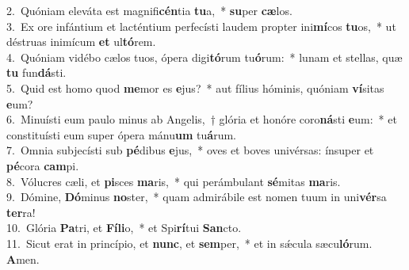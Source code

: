 {2.~}Quóniam eleváta est magnifi\textbf{cén}tia \textbf{tu}a,~* \textbf{su}per \textbf{cæ}los.\\
{3.~}Ex ore infántium et lacténtium perfecísti laudem propter ini\textbf{mí}cos \textbf{tu}os,~* ut déstruas inimícum \textbf{et} ul\textbf{tó}rem.\\
{4.~}Quóniam vidébo cælos tuos, ópera digi\textbf{tó}rum tu\textbf{ó}rum:~* lunam et stellas, quæ \textbf{tu} fun\textbf{dá}sti.\\
{5.~}Quid est homo quod \textbf{me}mor es \textbf{e}jus?~* aut fílius hóminis, quóniam \textbf{ví}sitas \textbf{e}um?\\
{6.~}Minuísti eum paulo minus ab Angelis,~† glória et honóre coro\textbf{ná}sti \textbf{e}um:~* et constituísti eum super ópera mánu\textbf{um} tu\textbf{á}rum.\\
{7.~}Omnia subjecísti sub \textbf{pé}dibus \textbf{e}jus,~* oves et boves univérsas: ínsuper et \textbf{pé}cora \textbf{cam}pi.\\
{8.~}Vólucres cæli, et \textbf{pi}sces \textbf{ma}ris,~* qui perámbulant \textbf{sé}mitas \textbf{ma}ris.\\
{9.~}Dómine, \textbf{Dó}minus \textbf{no}ster,~* quam admirábile est nomen tuum in uni\textbf{vér}sa \textbf{ter}ra!\\
{10.~}Glória \textbf{Pa}tri, et \textbf{Fí}\textbf{li}o,~* et Spi\textbf{rí}tui \textbf{San}cto.\\
{11.~}Sicut erat in princípio, et \textbf{nunc}, et \textbf{sem}per,~* et in sǽcula sæcu\textbf{ló}rum. \textbf{A}men.\\
